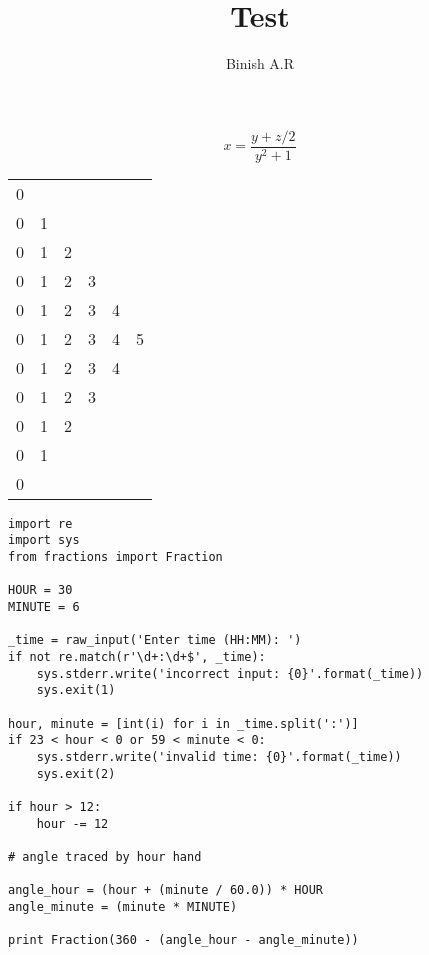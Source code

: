 \documentclass[10pt,a4paper]{article}
\author{Binish A.R}
\title{Test }
\begin{document}
\maketitle
$$x = \frac{y+z/2}{y^{2}+1}$$
\begin{tabular}{cccccc}
0\\
0&1\\
0&1&2\\
0&1&2&3\\
0&1&2&3&4\\
0&1&2&3&4&5\\
0&1&2&3&4\\
0&1&2&3\\
0&1&2\\
0&1\\
0\\
\end{tabular}

\begin{lstlisting}
import re
import sys
from fractions import Fraction

HOUR = 30
MINUTE = 6

_time = raw_input('Enter time (HH:MM): ')
if not re.match(r'\d+:\d+$', _time):
    sys.stderr.write('incorrect input: {0}'.format(_time))
    sys.exit(1)

hour, minute = [int(i) for i in _time.split(':')]
if 23 < hour < 0 or 59 < minute < 0:
    sys.stderr.write('invalid time: {0}'.format(_time))
    sys.exit(2)

if hour > 12:
    hour -= 12

# angle traced by hour hand

angle_hour = (hour + (minute / 60.0)) * HOUR
angle_minute = (minute * MINUTE)

print Fraction(360 - (angle_hour - angle_minute))
\end{lstlisting}
\end{document}
